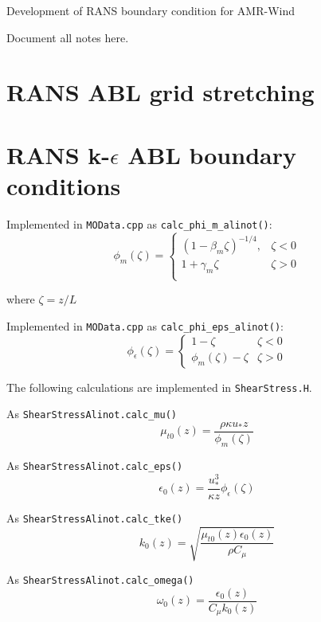 \documentclass{article}
\begin{document}
\begin{center}
{\Large{}Development of RANS boundary condition for
  AMR-Wind}{\Large\par} \par\end{center}

Document all notes here.

\section{RANS ABL grid stretching}

\section{RANS k-$\epsilon$ ABL boundary conditions}

Implemented in \texttt{MOData.cpp} as \texttt{calc\_phi\_m\_alinot()}: 
\begin{equation}
\phi_m\left(\zeta \right) =
\begin{cases}
\left( 1 - \beta_m \zeta \right)^{-1/4}, & \zeta < 0\\
1+ \gamma_m \zeta                       & \zeta > 0\\
\end{cases}
\end{equation}

where $\zeta=z/L$

Implemented in \texttt{MOData.cpp} as \texttt{calc\_phi\_eps\_alinot()}: 
\begin{equation}
  \phi_\epsilon\left( \zeta \right) =
  \begin{cases}
    1-\zeta                            & \zeta < 0\\
    \phi_m\left( \zeta \right) - \zeta & \zeta > 0
  \end{cases}
  \end{equation}

The following calculations are implemented in \texttt{ShearStress.H}.

As \texttt{ShearStressAlinot.calc\_mu()}
\begin{equation}
  \mu_{t0}(z) = \frac{\rho \kappa u_* z}{\phi_m(\zeta)}
\end{equation}

As \texttt{ShearStressAlinot.calc\_eps()}
\begin{equation}
  \epsilon_0(z) = \frac{u_*^3}{\kappa z} \phi_\epsilon(\zeta)
\end{equation}

As \texttt{ShearStressAlinot.calc\_tke()}
\begin{equation}
  k_0(z) = \sqrt{\frac{\mu_{t0}(z)\epsilon_0(z)}{\rho C_\mu}}
\end{equation}

As \texttt{ShearStressAlinot.calc\_omega()}
\begin{equation}
  \omega_0(z) = \frac{\epsilon_0(z)}{C_\mu k_0(z)}
\end{equation}
\end{document}
